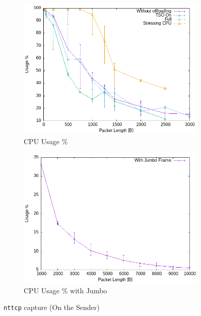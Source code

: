 \documentclass{exam}
\begin{document}
\begin{figure}[H]
\begin{subfigure}[b]{0.40\textwidth}
        \centering
        \includegraphics[width=\textwidth]{nttcp/cpu.png}
        \caption{CPU Usage \%}
        \label{fig:n-cpu}
    \end{subfigure}
    \hfill
    \begin{subfigure}[b]{0.40\textwidth}
        \centering
        \includegraphics[width=\textwidth]{nttcp/cpu_j.png}
        \caption{CPU Usage \% with Jumbo}
        \label{fig:n-cpu-j}
    \end{subfigure}

    \caption{\texttt{nttcp} capture (On the Sender)}
\end{figure}
\end{document}
